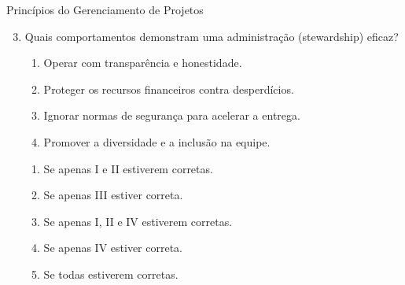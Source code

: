 \documentclass{beamer}
\begin{document}
\begin{frame}{Princípios do Gerenciamento de Projetos}
	\begin{enumerate}
		\setcounter{enumi}{2}
		\justifying
		\item Quais comportamentos demonstram uma administração (stewardship) eficaz?
		\begin{enumerate}[I]
			\item Operar com transparência e honestidade.
			\item Proteger os recursos financeiros contra desperdícios.
			\item Ignorar normas de segurança para acelerar a entrega.
			\item Promover a diversidade e a inclusão na equipe.
		\end{enumerate}
		\begin{enumerate}[a]
			\item Se apenas I e II estiverem corretas.
			\item Se apenas III estiver correta.
			\item \alert<2>{Se apenas I, II e IV estiverem corretas.}
			\item Se apenas IV estiver correta.
			\item Se todas estiverem corretas.
		\end{enumerate}
	\end{enumerate}
\end{frame}
\end{document}
